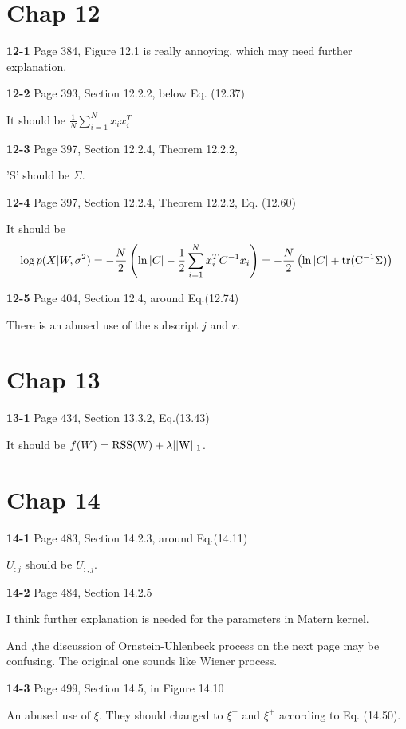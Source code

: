 \documentclass[aps,preprint,a4]{revtex4-1}
\newcommand{\nl}{\nonumber \\}
\begin{document}
\section{Chap 12}
{\color{red}\textbf{12-1}} Page 384, Figure 12.1 is really annoying, which may need
further explanation.

{\color{red}\textbf{12-2}} Page 393, Section 12.2.2, below Eq. (12.37)

It should be $\frac{1}{N}\sum_{i=1}^{N}x_{i}x_{i}^{T}$

{\color{red}\textbf{12-3}} Page 397, Section 12.2.4, Theorem 12.2.2,

'S' should be $\Sigma$.

{\color{red}\textbf{12-4}} Page 397, Section 12.2.4, Theorem 12.2.2, Eq. (12.60)

It should be
\begin{equation}
\log p(X|W,\sigma^{2}) = -\frac{N}{2}\left(\ln |C|-\frac{1}{2}\sum_{i=1}^{N}x_{i}^{T}C^{-1}x_{i}\right)
=  -\frac{N}{2}\left(\ln |C|+\rm tr(C^{-1}\Sigma)\right)\nl
\end{equation}

{\color{red}\textbf{12-5}} Page 404, Section 12.4, around Eq.(12.74)

There is an abused use of the subscript $j$ and $r$.

\section{Chap 13}
{\color{red}\textbf{13-1}} Page 434, Section 13.3.2, Eq.(13.43)

It should be $f(W) = \rm RSS(W) + \lambda||W||_{1}$.


\section{Chap 14}
{\color{red}\textbf{14-1}} Page 483, Section 14.2.3, around Eq.(14.11)

$U_{:j}$ should be $U_{:,j}$.

{\color{red}\textbf{14-2}} Page 484, Section 14.2.5

I think further explanation is needed for the parameters in Matern kernel.

And ,the discussion of Ornstein-Uhlenbeck process on the next page may be confusing.
The original one sounds like Wiener process.

{\color{red}\textbf{14-3}} Page 499, Section 14.5, in Figure 14.10

An abused use of $\xi$. They should changed to $\xi^{+}$ and $\xi^{+}$ according to
Eq. (14.50).
\end{document}

